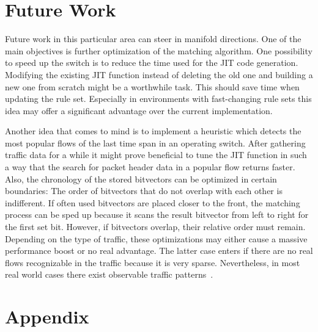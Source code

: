 \documentclass[a4paper,
		12pt,
		parskip=full,
		titlepage
		]{scrartcl}
\begin{document}
\section{Future Work}
Future work in this particular area can steer in manifold directions.
One of the main objectives is further optimization of the matching algorithm.
One possibility to speed up the switch is to reduce the time used for the JIT code generation.
Modifying the existing JIT function instead of deleting the old one and building 
a new one from scratch might be a worthwhile task.
This should save time when updating the rule set.
Especially in environments with fast-changing rule sets this idea may offer 
a significant advantage over the current implementation.

Another idea that comes to mind is to implement a heuristic which detects 
the most popular flows of the last time span in an operating switch.
After gathering traffic data for a while it might prove beneficial to tune 
the JIT function in such a way that the search for packet header data in a popular flow returns faster.
Also, the chronology of the stored bitvectors can be optimized in certain boundaries:
The order of bitvectors that do not overlap with each other is indifferent.
If often used bitvectors are placed closer to the front, the matching process 
can be sped up because it scans the result bitvector from left to right for the first set bit.
However, if bitvectors overlap, their relative order must remain.
Depending on the type of traffic, these optimizations may either cause a massive performance boost or no real advantage.
The latter case enters if there are no real flows recognizable in the traffic because it is very sparse.
Nevertheless, in most real world cases there exist observable traffic patterns~\cite{elephantmice}.

\appendix
\section{Appendix}
\pagestyle{empty}
\thispagestyle{scrheadings}
\begin{algorithm}
\begin{multicols}{2}
Assembler},
    breaklines=true,
    basicstyle=\footnotesize,
    numbers=left,
    texcl=true,
    xleftmargin=5.0ex,
    basicstyle=\footnotesize\ttfamily,
    keywordstyle=\bfseries\color{red},
    commentstyle=\itshape\color{grey},
    identifierstyle=\color{blue},
    morekeywords={retq,cmpq},
    ]
    {jit_listing.asm}
\end{multicols}
\label{lst:jit}
\end{algorithm}

\newpage
{}


\end{document}
